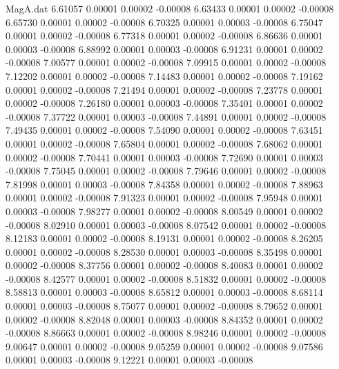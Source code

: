 \begin{filecontents}{MagA.dat}
   6.61057    0.00001    0.00002   -0.00008
   6.63433    0.00001    0.00002   -0.00008
   6.65730    0.00001    0.00002   -0.00008
   6.70325    0.00001    0.00003   -0.00008
   6.75047    0.00001    0.00002   -0.00008
   6.77318    0.00001    0.00002   -0.00008
   6.86636    0.00001    0.00003   -0.00008
   6.88992    0.00001    0.00003   -0.00008
   6.91231    0.00001    0.00002   -0.00008
   7.00577    0.00001    0.00002   -0.00008
   7.09915    0.00001    0.00002   -0.00008
   7.12202    0.00001    0.00002   -0.00008
   7.14483    0.00001    0.00002   -0.00008
   7.19162    0.00001    0.00002   -0.00008
   7.21494    0.00001    0.00002   -0.00008
   7.23778    0.00001    0.00002   -0.00008
   7.26180    0.00001    0.00003   -0.00008
   7.35401    0.00001    0.00002   -0.00008
   7.37722    0.00001    0.00003   -0.00008
   7.44891    0.00001    0.00002   -0.00008
   7.49435    0.00001    0.00002   -0.00008
   7.54090    0.00001    0.00002   -0.00008
   7.63451    0.00001    0.00002   -0.00008
   7.65804    0.00001    0.00002   -0.00008
   7.68062    0.00001    0.00002   -0.00008
   7.70441    0.00001    0.00003   -0.00008
   7.72690    0.00001    0.00003   -0.00008
   7.75045    0.00001    0.00002   -0.00008
   7.79646    0.00001    0.00002   -0.00008
   7.81998    0.00001    0.00003   -0.00008
   7.84358    0.00001    0.00002   -0.00008
   7.88963    0.00001    0.00002   -0.00008
   7.91323    0.00001    0.00002   -0.00008
   7.95948    0.00001    0.00003   -0.00008
   7.98277    0.00001    0.00002   -0.00008
   8.00549    0.00001    0.00002   -0.00008
   8.02910    0.00001    0.00003   -0.00008
   8.07542    0.00001    0.00002   -0.00008
   8.12183    0.00001    0.00002   -0.00008
   8.19131    0.00001    0.00002   -0.00008
   8.26205    0.00001    0.00002   -0.00008
   8.28530    0.00001    0.00003   -0.00008
   8.35498    0.00001    0.00002   -0.00008
   8.37756    0.00001    0.00002   -0.00008
   8.40083    0.00001    0.00002   -0.00008
   8.42577    0.00001    0.00002   -0.00008
   8.51832    0.00001    0.00002   -0.00008
   8.58813    0.00001    0.00003   -0.00008
   8.65812    0.00001    0.00003   -0.00008
   8.68114    0.00001    0.00003   -0.00008
   8.75077    0.00001    0.00002   -0.00008
   8.79652    0.00001    0.00002   -0.00008
   8.82048    0.00001    0.00003   -0.00008
   8.84352    0.00001    0.00002   -0.00008
   8.86663    0.00001    0.00002   -0.00008
   8.98246    0.00001    0.00002   -0.00008
   9.00647    0.00001    0.00002   -0.00008
   9.05259    0.00001    0.00002   -0.00008
   9.07586    0.00001    0.00003   -0.00008
   9.12221    0.00001    0.00003   -0.00008

\end{filecontents}
